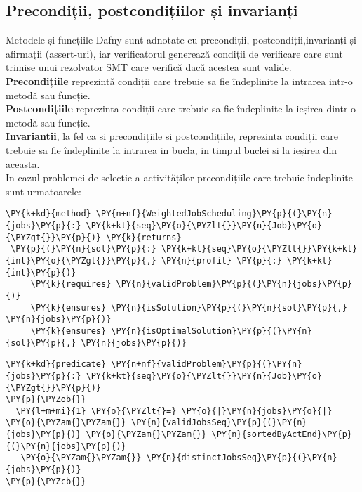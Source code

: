 \subsection{Precondiții, postcondițiilor și invarianți}
Metodele și funcțiile Dafny sunt adnotate cu precondiții, postcondiții,invarianți și afirmații (assert-uri), iar verificatorul generează condiții de verificare care sunt trimise unui rezolvator SMT care verifică
dacă acestea sunt valide.\cite{DBLP:journals/jlap/BlazquezMS23}\\
\textbf{Precondițiile} reprezintă condiții care trebuie sa fie îndeplinite la intrarea intr-o metodă sau funcție. \\\textbf{Postcondițiile} reprezinta condiții care trebuie sa fie îndeplinite la ieșirea dintr-o metodă sau funcție.
\\\textbf{Invariantii}, la fel ca si precondițiile si postcondițiile, reprezinta condiții care trebuie sa fie îndeplinite la intrarea in bucla, in timpul buclei si la ieșirea din aceasta. \\In cazul problemei de selectie a activităților precondițiile care trebuie îndeplinite sunt urmatoarele:
\begin{Verbatim}[commandchars=\\\{\}, fontsize=\small]
\PY{k+kd}{method} \PY{n+nf}{WeightedJobScheduling}\PY{p}{(}\PY{n}{jobs}\PY{p}{:} \PY{k+kt}{seq}\PY{o}{\PYZlt{}}\PY{n}{Job}\PY{o}{\PYZgt{}}\PY{p}{)} \PY{k}{returns}
 \PY{p}{(}\PY{n}{sol}\PY{p}{:} \PY{k+kt}{seq}\PY{o}{\PYZlt{}}\PY{k+kt}{int}\PY{o}{\PYZgt{}}\PY{p}{,} \PY{n}{profit} \PY{p}{:} \PY{k+kt}{int}\PY{p}{)}
     \PY{k}{requires} \PY{n}{validProblem}\PY{p}{(}\PY{n}{jobs}\PY{p}{)}
     \PY{k}{ensures} \PY{n}{isSolution}\PY{p}{(}\PY{n}{sol}\PY{p}{,} \PY{n}{jobs}\PY{p}{)}
     \PY{k}{ensures} \PY{n}{isOptimalSolution}\PY{p}{(}\PY{n}{sol}\PY{p}{,} \PY{n}{jobs}\PY{p}{)}
\end{Verbatim}
\begin{Verbatim}[commandchars=\\\{\}, fontsize=\small]
 \PY{k+kd}{predicate} \PY{n+nf}{validProblem}\PY{p}{(}\PY{n}{jobs}\PY{p}{:} \PY{k+kt}{seq}\PY{o}{\PYZlt{}}\PY{n}{Job}\PY{o}{\PYZgt{}}\PY{p}{)}
\PY{p}{\PYZob{}}
  \PY{l+m+mi}{1} \PY{o}{\PYZlt{}=} \PY{o}{|}\PY{n}{jobs}\PY{o}{|} \PY{o}{\PYZam{}\PYZam{}} \PY{n}{validJobsSeq}\PY{p}{(}\PY{n}{jobs}\PY{p}{)} \PY{o}{\PYZam{}\PYZam{}} \PY{n}{sortedByActEnd}\PY{p}{(}\PY{n}{jobs}\PY{p}{)}
   \PY{o}{\PYZam{}\PYZam{}} \PY{n}{distinctJobsSeq}\PY{p}{(}\PY{n}{jobs}\PY{p}{)}
\PY{p}{\PYZcb{}}
\end{Verbatim}
